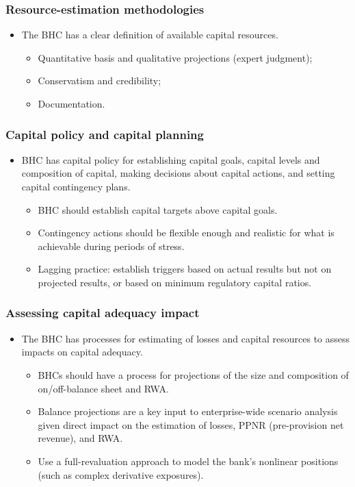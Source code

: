 \subsubsection{Resource-estimation methodologies}
\begin{itemize}
\item The BHC has a clear definition of available capital resources.
    \begin{itemize}
    \item Quantitative basis and qualitative projections (expert judgment);
    \item Conservatism and credibility;
    \item Documentation.
    \end{itemize}
    
\end{itemize}


\subsubsection{Capital policy and capital planning}
\begin{itemize}
\item BHC has capital policy for establishing capital goals, capital levels and composition of capital, making decisions about capital actions, and setting capital contingency plans.
    \begin{itemize}
    \item BHC should establish capital targets above capital goals.
    \item Contingency actions should be flexible enough and realistic for what is achievable during periods of stress.
    \item Lagging practice: establish triggers based on actual results but not on projected results, or based on minimum regulatory capital ratios.
    \end{itemize}
\end{itemize}


\subsubsection{Assessing capital adequacy impact}
\begin{itemize}
\item The BHC has processes for estimating of losses and capital resources to assess impacts on capital adequacy.
    \begin{itemize}
    \item BHCs should have a process for projections of the size and composition of on/off-balance sheet and RWA.
    \item Balance projections are a key input to enterprise-wide scenario analysis given direct impact on the estimation of losses, PPNR (pre-provision net revenue), and RWA.
    \item Use a full-revaluation approach to model the bank's nonlinear positions (such as complex derivative exposures).
    \end{itemize}  
\end{itemize}



